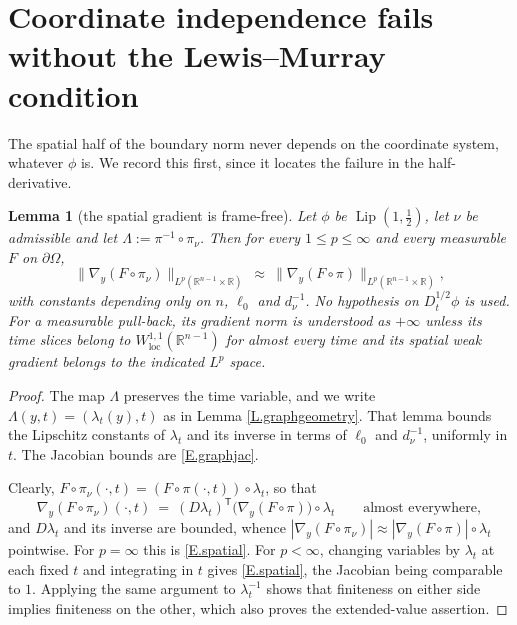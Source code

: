 \documentclass[12pt,leqno]{amsart}
\numberwithin{equation}{section}
\DeclareMathOperator{\Lip}{Lip}
\DeclareMathOperator{\loc}{loc}
\newcommand{\R}{\mathbb R}
\newcommand{\abs}[1]{\left\vert#1\right\vert}
\newcommand{\br}[1]{\left(#1\right)}
\newcommand{\pom}{\partial\Omega}
\newcommand{\dhalf}{D_t^{1/2}}
\theoremstyle{plain}
\newtheorem{lemma}[equation]{Lemma}
\theoremstyle{remark}
\begin{document}
\section{Coordinate independence fails without the Lewis--Murray condition}
\label{S.counter}

The spatial half of the boundary norm never depends on the coordinate system,
whatever $\phi$ is. We record this first, since it locates the failure in the
half-derivative.

\begin{lemma}[the spatial gradient is frame-free]\label{L.spatial}
Let $\phi$ be $\Lip(1,\tfrac12)$, let $\nu$ be admissible and let
$\Lambda:=\pi^{-1}\circ\pi_\nu$. Then for every $1\le p\le\infty$ and every
measurable $F$ on $\pom$,
\begin{equation}\label{E.spatial}
  \big\|\nabla_y\br{F\circ\pi_\nu}\big\|_{L^p(\R^{n-1}\times\R)}
  \ \approx\ \big\|\nabla_y\br{F\circ\pi}\big\|_{L^p(\R^{n-1}\times\R)} ,
\end{equation}
with constants depending only on $n$, $\ell_0$ and $d_\nu^{-1}$. No
hypothesis on $\dhalf\phi$ is used.
For a measurable pull-back, its gradient norm is understood as $+\infty$
unless its time slices belong to $W^{1,1}_{\loc}(\R^{n-1})$ for almost every
time and its spatial weak gradient belongs to the indicated $L^p$ space.
\end{lemma}

\begin{proof}
The map $\Lambda$ preserves the time variable, and we write
$\Lambda(y,t)=(\lambda_t(y),t)$ as in Lemma \ref{L.graphgeometry}.
That lemma bounds the Lipschitz constants of $\lambda_t$ and its inverse
in terms of $\ell_0$ and $d_\nu^{-1}$, uniformly in $t$.
The Jacobian bounds are \eqref{E.graphjac}.\medskip

Clearly, $F\circ\pi_\nu(\cdot,t)=\br{F\circ\pi(\cdot,t)}\circ\lambda_t$, so that
$$\nabla_y\br{F\circ\pi_\nu}(\cdot,t)
  \ =\ \br{D\lambda_t}^{\mathsf T}
   \Big(\nabla_y\br{F\circ\pi}\Big)\circ\lambda_t
  \qquad\text{almost everywhere},$$
and $D\lambda_t$ and its inverse are bounded, whence
$\abs{\nabla_y(F\circ\pi_\nu)}\approx\abs{\nabla_y(F\circ\pi)}\circ\lambda_t$
pointwise. For $p=\infty$ this is \eqref{E.spatial}. For $p<\infty$, changing
variables by $\lambda_t$ at each fixed $t$ and integrating in $t$ gives
\eqref{E.spatial}, the Jacobian being comparable to $1$.
Applying the same argument to $\lambda_t^{-1}$ shows that finiteness on
either side implies finiteness on the other, which also proves the
extended-value assertion.
\end{proof}
\end{document}
